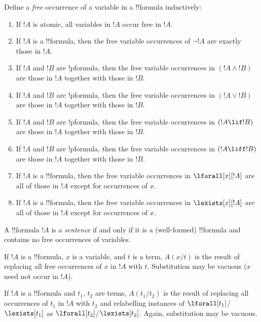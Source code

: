 \documentclass[../../include/open-logic-section]{subfiles}
\begin{document}
\begin{defn}
Define a \emph{free} occurrence of a variable in a !!{formula} inductively:
\begin{enumerate}
\item If $!A$ is atomic, all variables in $!A$ occur free in $!A$.
\item If $!A$ is a !!{formula}, then the free variable occurrences of
  $\lnot !A$ are exactly those in $!A$.
\item If $!A$ and $!B$ are !p{formula}, then the free variable
  occurrences in $(!A \land !B)$ are those in $!A$ together with those
  in $!B$.
\item If $!A$ and $!B$ are !p{formula}, then the free variable
  occurrences in $(!A \lor !B)$ are those in $!A$ together with those
  in $!B$.
\item If $!A$ and $!B$ are !p{formula}, then the free variable
  occurrences in $(!A \lif !B)$ are those in $!A$ together with those
  in $!B$.
\item If $!A$ and $!B$ are !p{formula}, then the free variable
  occurrences in $(!A \liff !B)$ are those in $!A$ together with those
  in $!B$.
\item If $!A$ is a !!{formula}, then the free variable occurrences in
  $\lforall[x][!A]$ are all of those in $!A$ except for occurrences of
  $x$.
\item If $!A$ is a !!{formula}, then the free variable occurrences in
  $\lexists[x][!A]$ are all of those in $!A$ except for occurrences of
  $x$.
\end{enumerate}
\end{defn}

\begin{defn}[Sentence]
A !!{formula} $!A$ is a \emph{sentence} if and only if it is a
(well-formed) !!{formula} and contains no free occurrences of variables.
\end{defn}


\begin{defn}
If $!A$ is a !!{formula}, $x$ is a variable, and $t$ is a term, $A(x/t)$
is the result of replacing all free occurrences of $x$ in $!A$ with
$t$. Substitution may be vacuous ($x$ need not occur in $!A$).
\end{defn}

\begin{defn}
If $!A$ is a !!{formula} and $t_1$, $t_2$ are terms, $A(t_1/t_2)$ is the result of replacing all occurrences of $t_1$ in $!A$ with $t_2$ and relabelling instances of $\lforall[t_1]$/$\lexists[t_1]$ as $\lforall[t_2]$/$\lexists[t_2]$. Again, substitution may be vacuous.
\end{defn}
\end{document}
